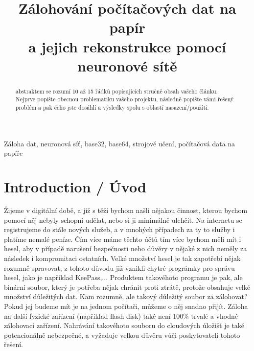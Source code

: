 \documentclass[conference]{IEEEtran}
\begin{document}
\title{Zálohování počítačových dat na papír\\ a jejich rekonstrukce pomocí neuronové sítě}

\author{
}

\maketitle

\begin{abstract}
abstraktem se rozumí 10 až 15 řádků popisujících stručně obsah vašeho článku. Nejprve popište obecnou problematiku vašeho projektu, následně popište vámi řešený problém a pak čeho jste dosáhli a výsledky spolu s oblastí nasazení/použití.
\end{abstract}

\begin{IEEEkeywords}
	Záloha dat, neuronová síť, base32, base64, strojové učení, počítačová data na papíře
\end{IEEEkeywords}

\IEEEpeerreviewmaketitle

\section{Introduction / Úvod}

Žijeme v digitální době, a již s těží bychom našli nějakou činnost, kterou bychom pomocí něj nebyly schopni udělat, nebo si ji minimálně ulehčit.  Na internetu se registrujeme do stále nových služeb, a v mnohých případech za ty to služby i platíme nemalé peníze. Čím více máme těchto účtů tím více bychom měli mít i hesel, aby v případě narušení bezpečnosti nebo důvěry v nějaké z nich neměly za následek i kompromitaci ostatních. Velké množství hesel je tak zapotřebí nějak rozumně spravovat, z tohoto důvodu již vznikli chytré prográmky pro správu hesel, jako je například KeePass,... Produktem takovéhoto programu je pak, ale binární soubor, který je potřeba nějak chránit proti ztrátě, protože obsahuje velké množství důležitých dat. Kam rozumně, ale takový důležitý soubor za zálohovat? Pokud jej budeme mít je na jednom počítači, můžeme o něj snadno přijít. Záloha na další fyzické zařízení (například flash disk) také není 100\% trvalé a vhodné zálohovací zařízení. Nahrávání takovéhoto souboru do cloudových úložišť je také potencionálně nebezpečné, a vyžaduje velkou důvěru vůči poskytovateli tohoto řešení. 
\end{document}
